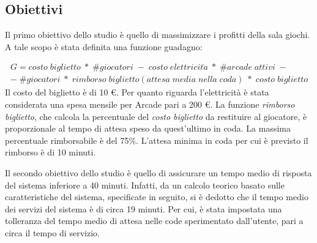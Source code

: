 \documentclass{article}
\begin{document}
\subsection{Obiettivi}
\label{Goal}
\par Il primo obiettivo dello studio è quello di massimizzare i profitti della sala giochi. A tale scopo è stata definita una funzione guadagno:

\begin{equation}
\begin{split}
   G = costo\; biglietto \;*\; \#giocatori\; -\; costo\; elettricit\grave a \;*\; \#arcade \;attivi\; - \\-\; \#giocatori \;*\; rimborso \;biglietto(attesa\;media\;nella\;coda)\;*\;costo\;biglietto
\end{split}
\end{equation}
Il costo del biglietto è di 10 \euro . Per quanto riguarda l'elettricità è stata considerata una spesa mensile per Arcade pari a 200 \euro. La funzione \textit{rimborso biglietto}, che calcola la percentuale del \textit{costo biglietto} da restituire al giocatore, è proporzionale al tempo di attesa speso da quest'ultimo in coda. La massima percentuale rimborsabile è del 75\%. L'attesa minima in coda per cui è previsto il rimborso è di 10 minuti. 
\\
\par Il secondo obiettivo dello studio è quello di assicurare un tempo medio di risposta del sistema inferiore a 40 minuti. Infatti, da un calcolo teorico basato sulle caratteristiche del sistema, specificate in seguito, si è dedotto che il tempo medio dei servizi del sistema è di circa 19 minuti. Per cui, è stata impostata una tolleranza del tempo medio di attesa nelle code sperimentato dall'utente, pari a circa il tempo di servizio.



	
\end{document}
